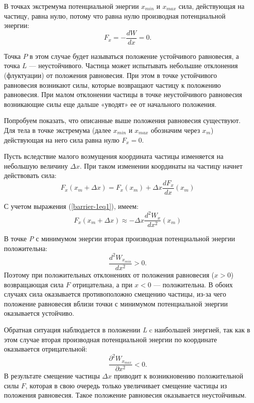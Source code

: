 \documentclass[All.tex]{subfiles}
\begin{document}
В точках экстремума потенциальной энергии $ x_{min} $ и $ x_{max} $ сила, действующая на частицу, равна нулю, потому что равна нулю производная потенциальной энергии:
\begin{equation}\label{barrier-1eq1}
F_{x} = -\frac{d W}{d x} = 0.
\end{equation}

Точка $ P $ в этом случае будет называться положение устойчивого равновесия, а точка $ L $ — неустойчивого. 
Частица может испытывать небольшие отклонения (флуктуации) от положения равновесия.
При этом в точке устойчивого равновесия возникают силы, которые возвращают частицу к положению равновесия. 
При малом отклонении частицы в точке неустойчивого равновесия возникающие силы еще дальше «уводят» ее от начального положения.

Попробуем показать, что описанные выше положения равновесия существуют.
Для тела в точке экстремума (далее $ x_{min} $ и $ x_{max} $ обозначим через $ x_{m} $) действующая на него сила равна нулю $ F_{x} = 0 $.

Пусть вследствие малого возмущения координата частицы изменяется на небольшую величину $ \Delta x $. 
При таком изменении координаты на частицу начнет действовать сила:
\begin{equation}\label{barrier-1eq2}
F_{x}(x_{m} + \Delta x) = F_{x}(x_{m}) + \Delta x \frac{d F_{x}}{d x}(x_{m})
\end{equation}

С учетом выражения (\ref{barrier-1eq1}), имеем:
\begin{equation}\label{barrier-1eq3}
F_{x}(x_{m} + \Delta x) \approx - \Delta x \frac{d^{2} W_{x}}{d x^{2}}(x_{m})
\end{equation}

В точке \textit{P} с минимумом энергии вторая производная потенциальной энергии положительна: $$ \frac{d^{2} W_{x_{min}}}{d x^{2}} > 0.$$
Поэтому при положительных отклонениях от положения равновесия ($ x > 0 $) возвращающая сила $ F $ отрицательна, а при $ x<0 $ — положительна.
В обоих случаях сила оказывается противоположно смещению частицы, из-за чего положение равновесия вблизи точки с минимумом потенциальной энергии оказывается устойчиво.

Обратная ситуация наблюдается в положении \textit{L} c наибольшей энергией, так как в этом случае вторая производная потенциальной энергии по координате оказывается отрицательной: $$ \frac{\partial^{2} W_{x_{max}}}{\partial x^{2}} < 0. $$ 
В результате смещение частицы  $ \Delta x $ приводит к возникновению положительной силы $ F $, которая в свою очередь только увеличивает смещение частицы из положения равновесия. 
Такое положение равновесия оказывается неустойчивым.
\end{document}
